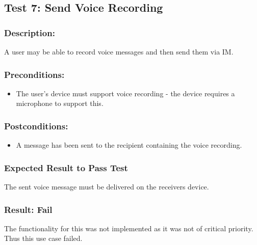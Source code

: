 \documentclass[11pt]{article}
\begin{document}
\subsection{Test 7: Send Voice Recording}
\subsubsection{Description:}
A user may be able to record voice messages and then send them via IM.
\subsubsection{Preconditions:} 
\begin{itemize}
\item The user's device must support voice recording - the device requires a microphone to support this.
\end{itemize}
\subsubsection{Postconditions:}
\begin{itemize}
\item A message has been sent to the recipient containing the voice recording.
\end{itemize}
\subsubsection{Expected Result to Pass Test}
The sent voice message must be delivered on the receivers device.
\subsubsection{Result: Fail}
The functionality for this was not implemented as it was not of critical priority. Thus this use case failed.
\end{document}
